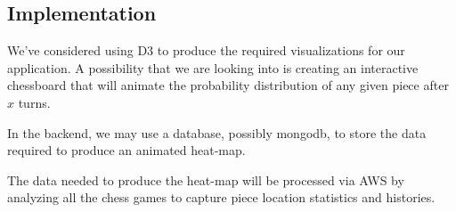 \documentclass[a4paper,10pt,oneside,leqno,titlepage,onecolumn]{article}
\begin{document}
\subsection{Implementation}
We've considered using D3 to produce the required visualizations for our application. A 
possibility that we are looking into is creating an interactive chessboard that will 
animate the probability distribution of any given piece after $x$ turns.

In the backend, we may use a database, possibly mongodb, to store the data required to 
produce an animated heat-map. 

The data needed to produce the heat-map will be processed via AWS by analyzing all the 
chess games to capture piece location statistics and histories.
\end{document}
